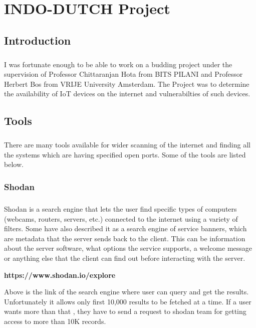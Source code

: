 \documentclass{report}
\begin{document}
\chapter{INDO-DUTCH Project}


\section{Introduction}
\paragraph{}
I was fortunate enough to be able to work on a budding project under the supervision of Professor Chittaranjan Hota from BITS PILANI and Professor Herbert Bos from VRIJE University Amsterdam. The Project was to determine the availability of IoT devices on the internet and vulnerabilties of such devices. 

\section{Tools}
\paragraph{}
There are many tools available for wider scanning of the internet and finding all the systems which are having specified open ports. Some of the tools are listed below.

\subsection{Shodan}
\paragraph{}
Shodan is a search engine that lets the user find specific types of computers (webcams, routers, servers, etc.) connected to the internet using a variety of filters. Some have also described it as a search engine of service banners, which are metadata that the server sends back to the client. This can be information about the server software, what options the service supports, a welcome message or anything else that the client can find out before interacting with the server.
\begin{center}
\textbf{https://www.shodan.io/explore} 
\end{center}
Above is the link of the search engine where user can query and get the results. Unfortunately it allows only first 10,000 results to be fetched at a time. If a user wants more than that , they have to send a request to shodan team for getting access to more than 10K records.
\end{document}
